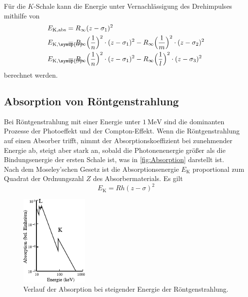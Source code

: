     Für die $K$-Schale kann die Energie unter Vernachlässigung des Drehimpulses mithilfe von
    \begin{align}
        \nonumber
        E_\text{K,abs} &= R_\infty (z - \sigma_1)^2
        \\
        \label{eqn:EnergieKalpha}
        E_{\mathmakebox[0pt][l]{\text{K},\symup{\alpha}}\phantom{\text{K,abs}}} &= R_\infty \Bigl(\frac{1}{n}\Bigr)^2 \cdot (z - \sigma_1)^2 -R_\infty \Bigl(\frac{1}{m}\Bigr)^2 \cdot (z - \sigma_2)^2
        \\
        \label{eqn:EnergieKbeta}
        E_{\mathmakebox[0pt][l]{\text{K},\symup{\beta}}\phantom{\text{K,abs}}} &= R_\infty \Bigl(\frac{1}{n}\Bigr)^2 \cdot (z - \sigma_1)^2 - R_\infty \Bigl(\frac{1}{l}\Bigr)^2 \cdot (z - \sigma_3)^2
    \end{align}
    berechnet werden.\\


\subsection{Absorption von Röntgenstrahlung}

    Bei Röntgenstrahlung mit einer Energie unter $\SI{1}{\mega\electronvolt}$ sind die dominanten Prozesse der Photoeffekt und der Compton-Effekt.
    Wenn die Röntgenstrahlung auf einen Absorber trifft,
    nimmt der Absorptionskoeffizient bei zunehmender Energie ab,
    steigt aber stark an,
    sobald die Photonenenergie größer als die Bindungsenergie der ersten Schale ist,
    was in \autoref{fig:Absorption} darstellt ist.\\
    Nach dem Moseley'schen Gesetz ist die Absorptionsenergie $E_\text{K}$ proportional zum Quadrat der Ordnungszahl $Z$ des Absorbermaterials.
    Es gilt
    \begin{equation}
        E_\text{K} = R h (z - \sigma)^2
        \label{eqn:Moseley}
    \end{equation}

    \begin{figure}
        \centering
        \includegraphics[width=0.3\textwidth]{content/img/Abb_2.pdf}
        \caption{Verlauf der Absorption bei steigender Energie der Röntgenstrahlung. \cite{versuchsanleitung}}
        \label{fig:Absorption}
    \end{figure}

